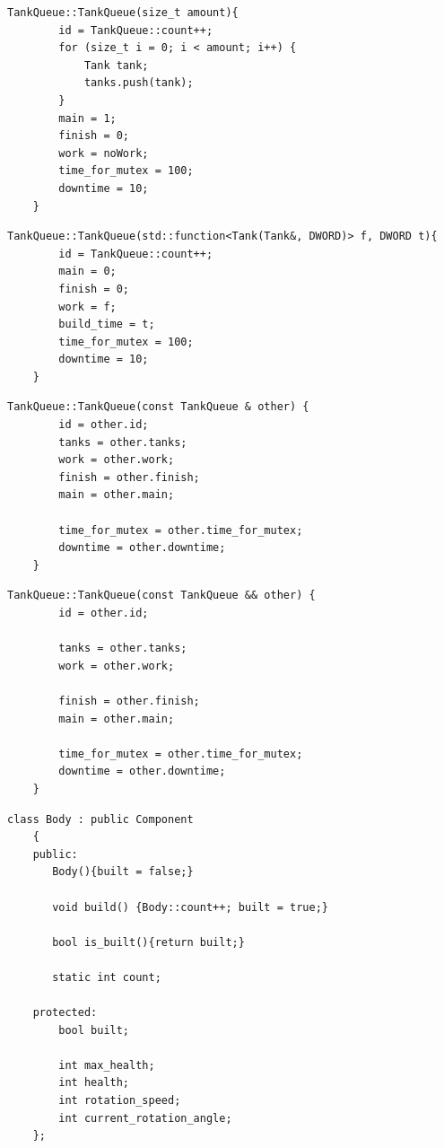 \documentclass[a4paper, 14pt]{article}
\begin{document}
    \begin{lstlisting}[label=code:TankQueue1,caption=Функция TankQueue(size\_t amount) - конструктор класса для пустой очереди.]
    TankQueue::TankQueue(size_t amount){
        id = TankQueue::count++;
        for (size_t i = 0; i < amount; i++) {
            Tank tank;
            tanks.push(tank);
        }
        main = 1;
        finish = 0;
        work = noWork;
        time_for_mutex = 100;
        downtime = 10;
    }
	\end{lstlisting}
	
	\begin{lstlisting}[label=code:TankQueue2,caption= Конструктор класса для очереди построения компонента.]
       TankQueue::TankQueue(std::function<Tank(Tank&, DWORD)> f, DWORD t){
        id = TankQueue::count++;
        main = 0;
        finish = 0;
        work = f;
        build_time = t;
        time_for_mutex = 100;
        downtime = 10;
    }
	\end{lstlisting}
	
	\begin{lstlisting}[label=code:TankQueue3,caption= Конструктор копирования.]
    TankQueue::TankQueue(const TankQueue & other) {
        id = other.id;
        tanks = other.tanks;
        work = other.work;
        finish = other.finish;
        main = other.main;
        
        time_for_mutex = other.time_for_mutex;
        downtime = other.downtime;
    }
	\end{lstlisting}
	
	\begin{lstlisting}[label=code:TankQueue4,caption= Конструктор перемещения.]
    TankQueue::TankQueue(const TankQueue && other) {
        id = other.id;
        
        tanks = other.tanks;
        work = other.work;
        
        finish = other.finish;
        main = other.main;
        
        time_for_mutex = other.time_for_mutex;
        downtime = other.downtime;
    }
	\end{lstlisting}
	
	\begin{lstlisting}[label=code:Body,caption= Вспомогательный класс Body.]
    class Body : public Component
    {
    public:
       Body(){built = false;}
    
       void build() {Body::count++; built = true;}
    
       bool is_built(){return built;}
    
       static int count;
       
    protected:
        bool built;
    
        int max_health;
        int health;
        int rotation_speed;
        int current_rotation_angle;
    };
	\end{lstlisting}
	
\end{document}
